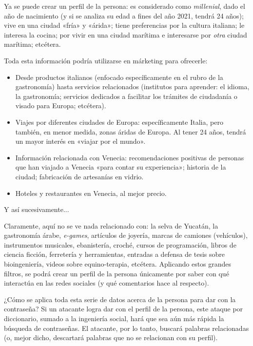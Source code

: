 \documentclass[12pt,a4paper,twoside]{book}
\begin{document}
Ya se puede crear un perfil de la persona: es considerado como \textit{millenial}, dado el año de nacimiento (y si se analiza su edad a fines del año 2021, tendrá 24 años); vive en una ciudad «fría» y «árida»; tiene preferencias por la cultura italiana; le interesa la cocina; por vivir en una ciudad marítima e interesarse por \textit{otra} ciudad marítima; etcétera.

Toda esta información podría utilizarse en márketing para ofrecerle:

\begin{itemize}
\item Desde productos italianos (enfocado específicamente en el rubro de la gastronomía) hasta servicios relacionados (institutos para aprender: el idioma, la gastronomía; servicios dedicados a facilitar los trámites de ciudadanía o visado para Europa; etcétera).
\item Viajes por diferentes ciudades de Europa: específicamente Italia, pero también, en menor medida, zonas áridas de Europa. Al tener 24 años, tendrá un mayor interés en «viajar por el mundo».
\item Información relacionada con Venecia: recomendaciones positivas de personas que han viajado a Venecia «para contar su experiencia»; historia de la ciudad; fabricación de artesanías en vidrio.
\item Hoteles y restaurantes en Venecia, al mejor precio.
\end{itemize}

Y así sucesivamente...

Claramente, aquí no se ve nada relacionado con: la selva de Yucatán, la gastronomía árabe, \textit{e-games}, artículos de joyería, marcas de camiones (vehículos), instrumentos musicales, ebanistería, croché, cursos de programación, libros de ciencia ficción, ferretería y herramientas, entradas a defensa de tesis sobre bioingeniería, videos sobre equino-terapia, etcétera. Aplicando estos grandes filtros, se podrá crear un perfil de la persona únicamente por saber con qué interactúa en las redes sociales (y qué comentarios hace al respecto).

¿Cómo se aplica toda esta serie de datos acerca de la persona para dar con la contraseña? Si un atacante logra dar con el perfil de la persona, este ataque por diccionario, sumado a la ingeniería social, hará que sea aún más rápida la búsqueda de contraseñas. El atacante, por lo tanto, buscará palabras relacionadas (o, mejor dicho, descartará palabras que no se relacionan con su perfil).
\end{document}
